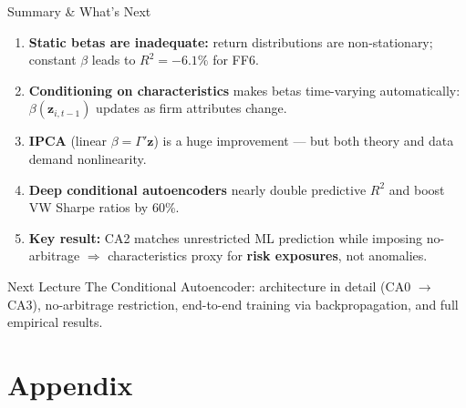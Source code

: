 \documentclass[aspectratio=169]{beamer}
\newcommand{\bz}{\bm{z}}
\begin{document}
\begin{frame}{Summary \& What's Next}

\begin{enumerate}
  \item \textbf{Static betas are inadequate:} return distributions are non-stationary; constant $\beta$ leads to $R^2 = -6.1\%$ for FF6.

  \item \textbf{Conditioning on characteristics} makes betas time-varying automatically: $\beta(\bz_{i,t-1})$ updates as firm attributes change.

  \item \textbf{IPCA} (linear $\beta = \Gamma'\bz$) is a huge improvement --- but both theory and data demand nonlinearity.

  \item \textbf{Deep conditional autoencoders} nearly double predictive $R^2$ and boost VW Sharpe ratios by 60\%.

  \item \textbf{Key result:} CA2 matches unrestricted ML prediction while imposing no-arbitrage $\Rightarrow$ characteristics proxy for \textbf{risk exposures}, not anomalies.
\end{enumerate}

\bigskip
\begin{block}{Next Lecture}
The Conditional Autoencoder: architecture in detail (CA0 $\to$ CA3), no-arbitrage restriction, end-to-end training via backpropagation, and full empirical results.
\end{block}

\end{frame}



%
\section{Appendix}
%
%
\end{document}
